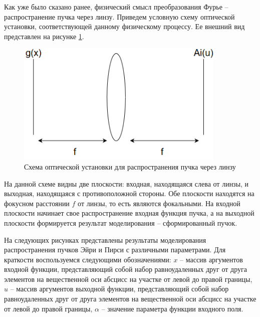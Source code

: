 {Как уже было сказано ранее, физический смысл преобразования Фурье -- распространение пучка через линзу. Приведем условную схему оптической установки, соответствующей данному физическому процессу. Ее внешний вид представлен на рисунке \ref{four_sys}.
	\begin{figure}[H]
		  \begin{center}
			\includegraphics[width=10cm]{plots/four_sys}
	\caption{Схема оптической установки для распространения пучка через линзу}
	\label{four_sys}
		 \end{center}
\end{figure}

На данной схеме видны две плоскости: входная, находящаяся слева от линзы, и выходная, находящаяся с противоположной стороны. Обе плоскости находятся на фокусном расстоянии $f$ от линзы, то есть являются фокальными. На входной плоскости начинает свое распространение входная функция пучка, а на выходной плоскости формируется результат моделирования -- сформированный пучок.

	На следующих рисунках представлены результаты моделирования
распространения пучков Эйри и Пирси с различными параметрами. Для
краткости воспользуемся следующими обозначениями: $x$ – массив аргументов
входной функции, представляющий собой набор равноудаленных друг от друга
элементов на вещественной оси абсцисс на участке от левой до правой
границы, $u$ – массив аргументов выходной функции, представляющий собой
набор равноудаленных друг от друга элементов на вещественной оси абсцисс
на участке от левой до правой границы, $\alpha$ – значение параметра функции
входного поля. 

}
